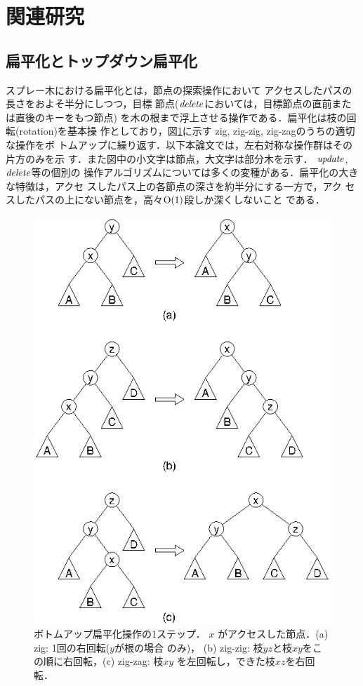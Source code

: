 \section{関連研究}

\subsection{扁平化とトップダウン扁平化}\label{subsection:splaying}

スプレー木における扁平化とは，節点の探索操作において
アクセスしたパスの長さをおよそ半分にしつつ，目標
節点(${\it delete\/}$においては，目標節点の直前または直後のキーをもつ節点)
を木の根まで浮上させる操作である．扁平化は枝の回転(rotation)を基本操
作としており，図\ref{figure:splaying}に示す
zig, zig-zig, zig-zagのうちの適切な操作をボ
トムアップに繰り返す．以下本論文では，左右対称な操作群はその片方のみを示
す．また図中の小文字は節点，大文字は部分木を示す．
%
${\it update}$, ${\it delete\/}$等の個別の
操作アルゴリズムについては多くの変種がある．扁平化の大きな特徴は，アクセ
スしたパス上の各節点の深さを約半分にする一方で，アク
セスしたパスの上にない節点を，高々${\rm O}(1)$段しか深くしないこと
である．

\begin{figure}[tb]
  \centerline {\includegraphics{images/fig1.eps}}
\caption{
ボトムアップ扁平化操作の1ステップ． %
$x$ がアクセスした節点．(a) zig: 1回の右回転($y$が根の場合
のみ)，
(b) zig-zig: 枝$yz$と枝$xy$をこの順に右回転，(c) zig-zag: 枝$xy$
を左回転し，できた枝$xz$を右回転．}
\label{figure:splaying}
\end{figure}

